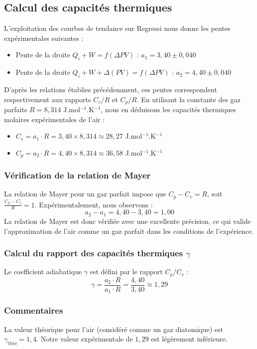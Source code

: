 \documentclass[a4paper,9pt,french]{scrartcl}
\begin{document}
\subsection{Calcul des capacités thermiques}

L'exploitation des courbes de tendance sur Regressi nous donne les pentes expérimentales suivantes :
\begin{itemize}
    \item Pente de la droite $Q_i + W = f(\Delta PV)$ : $a_1 = 3,40\pm0,040$
    \item Pente de la droite $Q_i + W + \Delta(PV) = f(\Delta PV)$ : $a_2 = 4,40\pm0,040$
\end{itemize}

D'après les relations établies précédemment, ces pentes correspondent respectivement aux rapports $C_v/R$ et $C_p/R$. En utilisant la constante des gaz parfaits $R = 8,314$ J.mol$^{-1}$.K$^{-1}$, nous en déduisons les capacités thermiques molaires expérimentales de l'air :

\begin{itemize}
    \item $C_v = a_1 \cdot R = 3,40 \times 8,314 \approx 28,27$ J.mol$^{-1}$.K$^{-1}$
    \item $C_p = a_2 \cdot R = 4,40 \times 8,314 \approx 36,58$ J.mol$^{-1}$.K$^{-1}$
\end{itemize}

\subsubsection*{Vérification de la relation de Mayer}
La relation de Mayer pour un gaz parfait impose que $C_p - C_v = R$, soit $\frac{C_p - C_v}{R} = 1$. 
Expérimentalement, nous observons :
$$a_2 - a_1 = 4,40 - 3,40 = 1,00$$
La relation de Mayer est donc vérifiée avec une excellente précision, ce qui valide l'approximation de l'air comme un gaz parfait dans les conditions de l'expérience.

\subsubsection*{Calcul du rapport des capacités thermiques $\gamma$}
Le coefficient adiabatique $\gamma$ est défini par le rapport $C_p/C_v$ :
$$\gamma = \frac{a_2 \cdot R}{a_1 \cdot R} = \frac{4,40}{3,40} \approx 1,29$$

\subsubsection*{Commentaires}
La valeur théorique pour l'air (considéré comme un gaz diatomique) est $\gamma_{théo} = 1,4$. Notre valeur expérimentale de $1,29$ est légèrement inférieure. 
\end{document}
